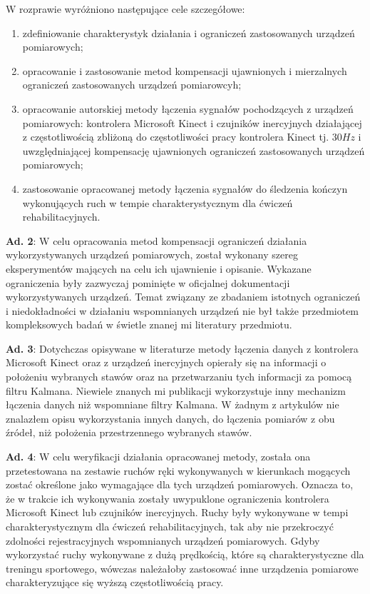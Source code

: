 \documentclass[10pt,a4paper]{article}
\begin{document}
	\begin{FlushLeft}
	W rozprawie wyróżniono następujące cele szczegółowe:
	\begin{enumerate}[1. ]
		\item zdefiniowanie charakterystyk działania i ograniczeń zastosowanych urządzeń pomiarowych;
	
		\item opracowanie i zastosowanie metod kompensacji ujawnionych i mierzalnych ograniczeń zastosowanych urządzeń pomiarowcyh;
			\item opracowanie autorskiej metody łączenia sygnałów pochodzących z urządzeń pomiarowych: kontrolera Microsoft Kinect i czujników inercyjnych działającej z częstotliwością zbliżoną do częstotliwości pracy kontrolera Kinect tj. $30Hz$ i uwzględniającej kompensację ujawnionych ograniczeń zastosowanych urządzeń pomiarowych;		
		\item zastosowanie opracowanej metody łączenia sygnałów do śledzenia kończyn wykonujących ruch w tempie charakterystycznym dla ćwiczeń rehabilitacyjnych.
	\end{enumerate}

\textbf{Ad. 2}: W celu opracowania metod kompensacji ograniczeń działania wykorzystywanych urządzeń pomiarowych, został wykonany szereg eksperymentów mających na celu ich ujawnienie i opisanie. Wykazane ograniczenia były zazwyczaj pominięte w oficjalnej dokumentacji wykorzystywanych urządzeń. Temat związany ze zbadaniem istotnych ograniczeń i niedokładności w działaniu wspomnianych urządzeń nie był także przedmiotem kompleksowych badań w świetle znanej mi literatury przedmiotu.

\textbf{Ad. 3}: Dotychczas opisywane w literaturze metody łączenia danych z kontrolera Microsoft Kinect oraz z urządzeń inercyjnych opierały się na informacji o położeniu wybranych stawów oraz na przetwarzaniu tych informacji za pomocą filtru Kalmana. Niewiele znanych mi publikacji wykorzystuje inny mechanizm łączenia danych niż wspomniane filtry Kalmana. W żadnym z artykulów nie znalazłem opisu wykorzystania innych danych, do łączenia pomiarów z obu źródeł, niż położenia przestrzennego wybranych stawów.

\textbf{Ad. 4}: W celu weryfikacji działania opracowanej metody, została ona przetestowana na zestawie ruchów ręki wykonywanych w kierunkach mogących zostać określone jako wymagające dla tych urządzeń pomiarowych. Oznacza to, że w trakcie ich wykonywania zostały uwypuklone ograniczenia kontrolera Microsoft Kinect lub czujników inercyjnych. Ruchy były wykonywane w tempi charakterystycznym dla ćwiczeń rehabilitacyjnych, tak aby nie przekroczyć zdolności rejestracyjnych wspomnianych urządzeń pomiarowych. Gdyby wykorzystać ruchy wykonywane z dużą prędkością, które są charakterystyczne dla treningu sportowego, wówczas należałoby zastosować inne urządzenia pomiarowe charakteryzujące się wyższą częstotliwością pracy. 


\end{FlushLeft}
\end{document}
